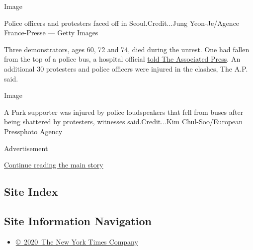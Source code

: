 Image

Police officers and protesters faced off in Seoul.Credit...Jung
Yeon-Je/Agence France-Presse --- Getty Images

Three demonstrators, ages 60, 72 and 74, died during the unrest. One had
fallen from the top of a police bus, a hospital official
\href{http://bigstory.ap.org/article/dbfcdb68025249cab330f5b33e2d1929/south-koreas-president-formally-ousted-court}{told
The Associated Press}. An additional 30 protesters and police officers
were injured in the clashes, The A.P. said.

Image

A Park supporter was injured by police loudspeakers that fell from buses
after being shattered by protesters, witnesses said.Credit...Kim
Chul-Soo/European Pressphoto Agency

Advertisement

\protect\hyperlink{after-bottom}{Continue reading the main story}

\hypertarget{site-index}{%
\subsection{Site Index}\label{site-index}}

\hypertarget{site-information-navigation}{%
\subsection{Site Information
Navigation}\label{site-information-navigation}}

\begin{itemize}
\tightlist
\item
  \href{https://help.nytimes.com/hc/en-us/articles/115014792127-Copyright-notice}{©~2020~The
  New York Times Company}
\end{itemize}

